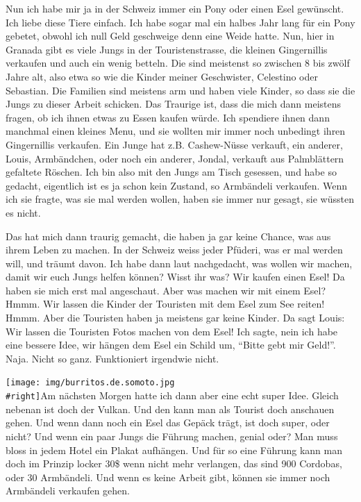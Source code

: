 \documentclass[
]{article}
\begin{document}
Nun ich habe mir ja in der Schweiz immer ein Pony oder einen Esel
gewünscht. Ich liebe diese Tiere einfach. Ich habe sogar mal ein halbes
Jahr lang für ein Pony gebetet, obwohl ich null Geld geschweige denn
eine Weide hatte. Nun, hier in Granada gibt es viele Jungs in der
Touristenstrasse, die kleinen Gingernillis verkaufen und auch ein wenig
betteln. Die sind meistenst so zwischen 8 bis zwölf Jahre alt, also etwa
so wie die Kinder meiner Geschwister, Celestino oder Sebastian. Die
Familien sind meistens arm und haben viele Kinder, so dass sie die Jungs
zu dieser Arbeit schicken. Das Traurige ist, dass die mich dann meistens
fragen, ob ich ihnen etwas zu Essen kaufen würde. Ich spendiere ihnen
dann manchmal einen kleines Menu, und sie wollten mir immer noch
unbedingt ihren Gingernillis verkaufen. Ein Junge hat z.B. Cashew-Nüsse
verkauft, ein anderer, Louis, Armbändchen, oder noch ein anderer,
Jondal, verkauft aus Palmblättern gefaltete Röschen. Ich bin also mit
den Jungs am Tisch gesessen, und habe so gedacht, eigentlich ist es ja
schon kein Zustand, so Armbändeli verkaufen. Wenn ich sie fragte, was
sie mal werden wollen, haben sie immer nur gesagt, sie wüssten es nicht.

Das hat mich dann traurig gemacht, die haben ja gar keine Chance, was
aus ihrem Leben zu machen. In der Schweiz weiss jeder Pfüderi, was er
mal werden will, und träumt davon. Ich habe dann laut nachgedacht, was
wollen wir machen, damit wir euch Jungs helfen können? Wisst ihr was?
Wir kaufen einen Esel! Da haben sie mich erst mal angeschaut. Aber was
machen wir mit einem Esel? Hmmm. Wir lassen die Kinder der Touristen mit
dem Esel zum See reiten! Hmmm. Aber die Touristen haben ja meistens gar
keine Kinder. Da sagt Louis: Wir lassen die Touristen Fotos machen von
dem Esel! Ich sagte, nein ich habe eine bessere Idee, wir hängen dem
Esel ein Schild um, ``Bitte gebt mir Geld!''. Naja. Nicht so ganz.
Funktioniert irgendwie nicht.

\texttt{[image: img/burritos.de.somoto.jpg\\\#right]}Am nächsten Morgen
hatte ich dann aber eine echt super Idee. Gleich nebenan ist doch der
Vulkan. Und den kann man als Tourist doch anschauen gehen. Und wenn dann
noch ein Esel das Gepäck trägt, ist doch super, oder nicht? Und wenn ein
paar Jungs die Führung machen, genial oder? Man muss bloss in jedem
Hotel ein Plakat aufhängen. Und für so eine Führung kann man doch im
Prinzip locker 30\$ wenn nicht mehr verlangen, das sind 900 Cordobas,
oder 30 Armbändeli. Und wenn es keine Arbeit gibt, können sie immer noch
Armbändeli verkaufen gehen.
\end{document}
